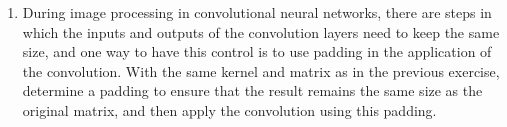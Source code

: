 \begin{enumerate}
\item \noindent During image processing in convolutional neural networks, there are steps in which the inputs and outputs of the convolution layers need to keep the same size, and one way to have this control is to use padding in the application of the convolution. With the same kernel and matrix as in the previous exercise, determine a padding to ensure that the result remains the same size as the original matrix, and then apply the convolution using this padding.


%
%
%
%
\end{enumerate}